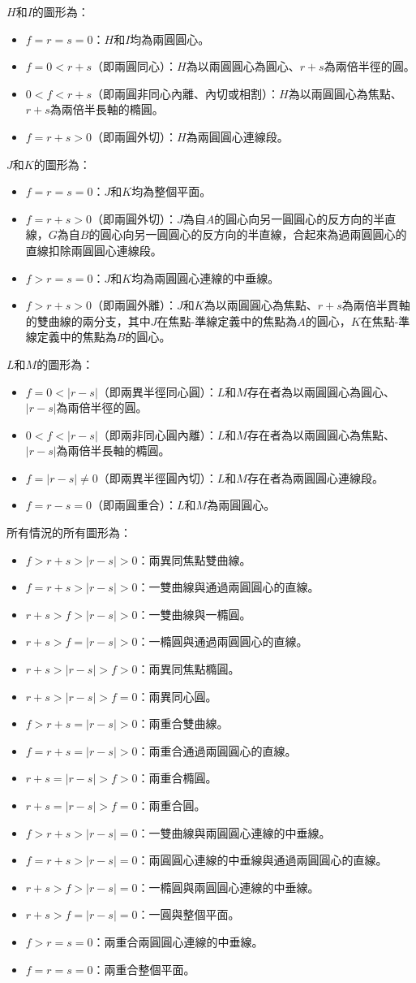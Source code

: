 \documentclass[a4paper,12pt]{report}
\begin{document}
$H$和$I$的圖形為：
\begin{itemize}
\item $f=r=s=0$：$H$和$I$均為兩圓圓心。
\item $f=0<r+s$（即兩圓同心）：$H$為以兩圓圓心為圓心、$r+s$為兩倍半徑的圓。
\item $0<f<r+s$（即兩圓非同心內離、內切或相割）：$H$為以兩圓圓心為焦點、$r+s$為兩倍半長軸的橢圓。
\item $f=r+s>0$（即兩圓外切）：$H$為兩圓圓心連線段。
\end{itemize}
$J$和$K$的圖形為：
\begin{itemize}
\item $f=r=s=0$：$J$和$K$均為整個平面。
\item $f=r+s>0$（即兩圓外切）：$J$為自$A$的圓心向另一圓圓心的反方向的半直線，$G$為自$B$的圓心向另一圓圓心的反方向的半直線，合起來為過兩圓圓心的直線扣除兩圓圓心連線段。
\item $f>r=s=0$：$J$和$K$均為兩圓圓心連線的中垂線。
\item $f>r+s>0$（即兩圓外離）：$J$和$K$為以兩圓圓心為焦點、$r+s$為兩倍半貫軸的雙曲線的兩分支，其中$J$在焦點-準線定義中的焦點為$A$的圓心，$K$在焦點-準線定義中的焦點為$B$的圓心。
\end{itemize}
$L$和$M$的圖形為：
\begin{itemize}
\item $f=0<|r-s|$（即兩異半徑同心圓）：$L$和$M$存在者為以兩圓圓心為圓心、$|r-s|$為兩倍半徑的圓。
\item $0<f<|r-s|$（即兩非同心圓內離）：$L$和$M$存在者為以兩圓圓心為焦點、$|r-s|$為兩倍半長軸的橢圓。
\item $f=|r-s|\neq 0$（即兩異半徑圓內切）：$L$和$M$存在者為兩圓圓心連線段。
\item $f=r-s=0$（即兩圓重合）：$L$和$M$為兩圓圓心。
\end{itemize}
所有情況的所有圖形為：
\begin{itemize}
\item $f>r+s>|r-s|>0$：兩異同焦點雙曲線。
\item $f=r+s>|r-s|>0$：一雙曲線與通過兩圓圓心的直線。
\item $r+s>f>|r-s|>0$：一雙曲線與一橢圓。
\item $r+s>f=|r-s|>0$：一橢圓與通過兩圓圓心的直線。
\item $r+s>|r-s|>f>0$：兩異同焦點橢圓。
\item $r+s>|r-s|>f=0$：兩異同心圓。
\item $f>r+s=|r-s|>0$：兩重合雙曲線。
\item $f=r+s=|r-s|>0$：兩重合通過兩圓圓心的直線。
\item $r+s=|r-s|>f>0$：兩重合橢圓。
\item $r+s=|r-s|>f=0$：兩重合圓。
\item $f>r+s>|r-s|=0$：一雙曲線與兩圓圓心連線的中垂線。
\item $f=r+s>|r-s|=0$：兩圓圓心連線的中垂線與通過兩圓圓心的直線。
\item $r+s>f>|r-s|=0$：一橢圓與兩圓圓心連線的中垂線。
\item $r+s>f=|r-s|=0$：一圓與整個平面。
\item $f>r=s=0$：兩重合兩圓圓心連線的中垂線。
\item $f=r=s=0$：兩重合整個平面。
\end{itemize}
\end{document}
